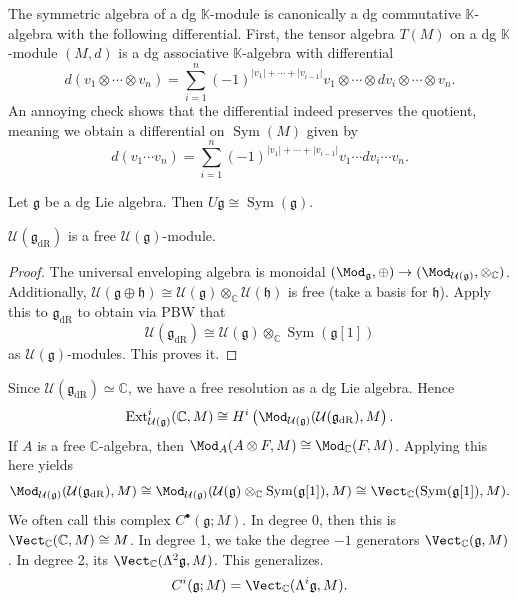 \begin{remark}\label{3.3.8}
	The symmetric algebra of a dg $\mathbb{K} $-module is canonically a dg commutative $\mathbb{K} $-algebra with the following differential. First, the tensor algebra $T(M)$ on a dg $\mathbb{K} $-module $(M,d)$ is a dg associative $\mathbb{K} $-algebra with differential
	\[
		d(v_1 \otimes \cdots \otimes v_n) = \sum_{i=1}^{n} (-1)^{\left| v_1 \right| +\cdots +\left| v_{i-1}  \right| } v_1 \otimes \cdots \otimes dv_i \otimes \cdots \otimes v_n
	.\]
	An annoying check shows that the differential indeed preserves the quotient, meaning we obtain a differential on $\operatorname{Sym} (M)$ given by
	\[
		d(v_1 \cdots v_n) = \sum_{i=1}^{n} (-1)^{\left| v_1 \right| + \cdots + \left| v_{i-1}  \right| } v_1 \cdots dv_i \cdots v_n
	.\]
\end{remark}



\begin{theorem}[PBW]\label{3.3.9}
	Let $\mathfrak{g} $ be a dg Lie algebra. Then $U\mathfrak{g}\cong \operatorname{Sym} (\mathfrak{g} )$. 
\end{theorem}

\begin{lemma}\label{lma:asjkskjas}
	$\mathcal{U} (\mathfrak{g} _{\mathrm{dR} } )$ is a free $\mathcal{U} (\mathfrak{g} )$-module.
\end{lemma}
\begin{proof}
	The universal enveloping algebra is monoidal $(\Mod _\mathfrak{g} ,\oplus )\to (\Mod _{\mathcal{U} (\mathfrak{g} )} ,\otimes_\mathbb{C}  )$. Additionally, $\mathcal{U} (\mathfrak{g} \oplus \mathfrak{h} )\cong \mathcal{U} (\mathfrak{g} )\otimes_\mathbb{C} \mathcal{U} (\mathfrak{h} )$ is free (take a basis for $\mathfrak{h} $). Apply this to $\mathfrak{g} _{\mathrm{dR} } $ to obtain via PBW that
	\[
		\mathcal{U} (\mathfrak{g} _{\mathrm{dR} } )\cong \mathcal{U} (\mathfrak{g} )\otimes _\mathbb{C} \operatorname{Sym} (\mathfrak{g} [1])
	\]
	as $\mathcal{U} (\mathfrak{g} )$-modules. This proves it.
\end{proof}

Since $\mathcal{U} (\mathfrak{g} _{\mathrm{dR} }) \simeq \mathbb{C} $, we have a free resolution as a dg Lie algebra. Hence
\[
	\operatorname{Ext}_{\mathcal{U} (\mathfrak{g} )} ^i(\mathbb{C} ,M) \cong H^i\left( \Mod_{\mathcal{U} (\mathfrak{g} )} (\mathcal{U} (\mathfrak{g} _{\mathrm{dR} } ),M \right) 
.\]
If $A$ is a free $\mathbb{C} $-algebra, then $\Mod _A(A\otimes F,M)\cong \Mod _\mathbb{C} (F,M)$. Applying this here yields
\[
	\Mod _{\mathcal{U} (\mathfrak{g} )} (\mathcal{U} (\mathfrak{g} _{\mathrm{dR} } ),M)\cong \Mod_{\mathcal{U} (\mathfrak{g} )} (\mathcal{U}(\mathfrak{g} )\otimes_\mathbb{C} \operatorname{Sym} (\mathfrak{g} [1]),M) \cong \Vect_{\mathbb{C} } (\operatorname{Sym} (\mathfrak{g} [1]),M)
.\]
We often call this complex $C^{\bullet} (\mathfrak{g} ;M)$. In degree 0, then this is $\Vect_{\mathbb{C} } (\mathbb{C} ,M)\cong M$. In degree 1, we take the degree $-1$ generators $\Vect_{\mathbb{C} } (\mathfrak{g} ,M)$. In degree 2, its $\Vect_{\mathbb{C} } (\Lambda ^2\mathfrak{g} ,M)$. This generalizes.
\[
	C^i(\mathfrak{g} ;M)=\Vect_{\mathbb{C} } (\Lambda ^i\mathfrak{g} ,M)
.\]

